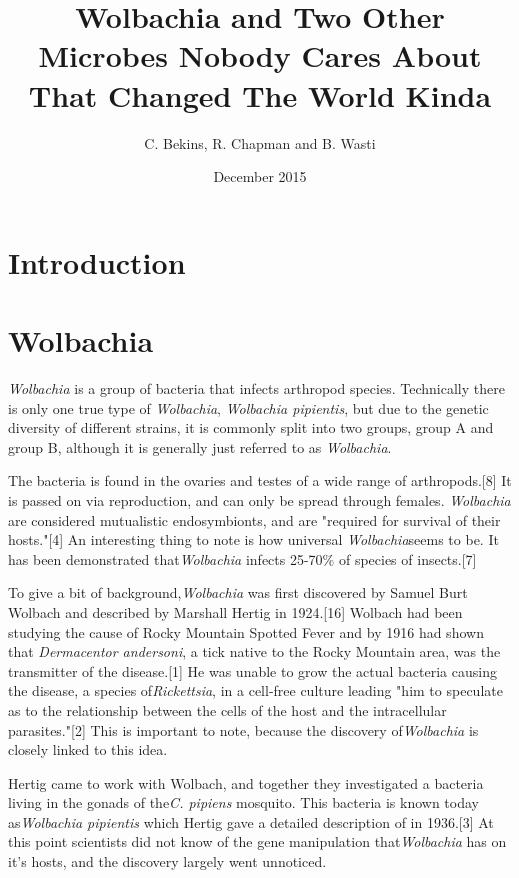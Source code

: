 \documentclass[twocolumn]{article}
\begin{document}
\title{Wolbachia and Two Other Microbes Nobody Cares About That Changed The World Kinda}
    \author{C. Bekins, R. Chapman and B. Wasti}
    \date{December 2015}
    \maketitle

\section*{Introduction}
\section*{Wolbachia}
\textit{Wolbachia} is a group of bacteria that infects arthropod species. Technically there is only one true type of \textit{Wolbachia}, \textit{Wolbachia pipientis}, but due to the genetic diversity of different strains, it is commonly split into two groups, group A and group B, although it is generally just referred to as \textit{Wolbachia}.

The bacteria is found in the ovaries and testes of a wide range of arthropods.[8] It is passed on via reproduction, and can only be spread through females. \textit{Wolbachia} are considered mutualistic endosymbionts, and are "required for survival of their hosts."[4] An interesting thing to note is how universal \textit{Wolbachia}seems to be. It has been demonstrated that\textit{Wolbachia} infects 25-70\% of species of insects.[7]

To give a bit of background,\textit{Wolbachia} was first discovered by Samuel Burt Wolbach and described by Marshall Hertig in 1924.[16] Wolbach had been studying the cause of Rocky Mountain Spotted Fever and by 1916 had shown that \textit{Dermacentor andersoni}, a tick native to the Rocky Mountain area, was the transmitter of the disease.[1] He was unable to grow the actual bacteria causing the disease, a species of\textit{Rickettsia}, in a cell-free culture leading "him to speculate as to the relationship between the cells of the host and the intracellular parasites."[2] This is important to note, because the discovery of\textit{Wolbachia} is closely linked to this idea.

Hertig came to work with Wolbach, and together they investigated a bacteria living in the gonads of the\textit{C. pipiens} mosquito. This bacteria is known today as\textit{Wolbachia pipientis} which Hertig gave a detailed description of in 1936.[3] At this point scientists did not know of the gene manipulation that\textit{Wolbachia} has on it's hosts, and the discovery largely went unnoticed.
\end{document}
